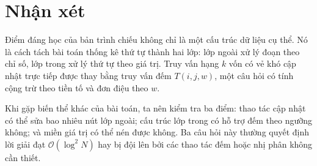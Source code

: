 \documentclass[11pt]{article}
\newcommand{\Oh}{\mathcal{O}}
\begin{document}
\section{Nhận xét}

Điểm đáng học của bản trình chiếu không chỉ là một cấu trúc dữ liệu cụ thể.
Nó là cách tách bài toán thống kê thứ tự thành hai lớp: lớp ngoài xử lý đoạn
theo chỉ số, lớp trong xử lý thứ tự theo giá trị. Truy vấn hạng \(k\) vốn có
vẻ khó cập nhật trực tiếp được thay bằng truy vấn đếm \(T(i,j,w)\), một câu
hỏi có tính cộng trừ theo tiền tố và đơn điệu theo \(w\).

Khi gặp biến thể khác của bài toán, ta nên kiểm tra ba điểm: thao tác cập nhật
có thể sửa bao nhiêu nút lớp ngoài; cấu trúc lớp trong có hỗ trợ đếm theo
ngưỡng không; và miền giá trị có thể nén được không. Ba câu hỏi này thường
quyết định lời giải đạt \(\Oh(\log^2 N)\) hay bị đội lên bởi các thao tác đếm
hoặc nhị phân không cần thiết.
\end{document}
